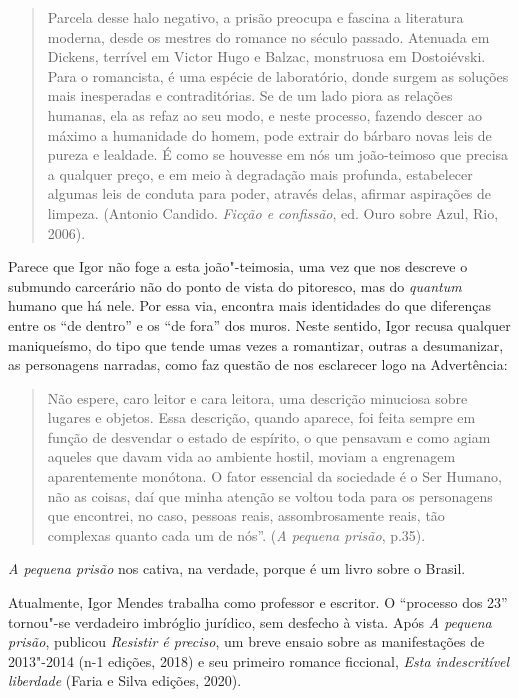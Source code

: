 \documentclass[11pt]{extarticle}
\begin{document}
\begin{quote}
Parcela desse halo negativo, a prisão preocupa e fascina a
literatura moderna, desde os mestres do romance no século passado.
Atenuada em Dickens, terrível em Victor Hugo e Balzac, monstruosa em
Dostoiévski. Para o romancista, é uma espécie de laboratório, donde
surgem as soluções mais inesperadas e contraditórias. Se de um lado
piora as relações humanas, ela as refaz ao seu modo, e neste processo,
fazendo descer ao máximo a humanidade do homem, pode extrair do bárbaro
novas leis de pureza e lealdade. É como se houvesse em nós um
joão-teimoso que precisa a qualquer preço, e em meio à degradação mais
profunda, estabelecer algumas leis de conduta para poder, através delas,
afirmar aspirações de limpeza. (Antonio Candido. \emph{Ficção e confissão},
ed. Ouro sobre Azul, Rio, 2006).
\end{quote}

Parece que Igor não foge a esta joão"-teimosia, uma vez que nos descreve
o submundo carcerário não do ponto de vista do pitoresco, mas do
\emph{quantum} humano que há nele. Por essa via, encontra mais
identidades do que diferenças entre os ``de dentro'' e os ``de fora''
dos muros. Neste sentido, Igor recusa qualquer maniqueísmo, do tipo que
tende umas vezes a romantizar, outras a desumanizar, as personagens
narradas, como faz questão de nos esclarecer logo na Advertência:

\begin{quote}
Não espere, caro leitor e cara leitora, uma descrição minuciosa
sobre lugares e objetos. Essa descrição, quando aparece, foi feita
sempre em função de desvendar o estado de espírito, o que pensavam e
como agiam aqueles que davam vida ao ambiente hostil, moviam a
engrenagem aparentemente monótona. O fator essencial da sociedade é o
Ser Humano, não as coisas, daí que minha atenção se voltou toda para os
personagens que encontrei, no caso, pessoas reais, assombrosamente
reais, tão complexas quanto cada um de nós''. (\emph{A
pequena prisão}, p.35).
\end{quote}


\emph{A
pequena prisão} nos cativa, na verdade, porque é um livro sobre o
Brasil.

Atualmente, Igor Mendes trabalha como professor e escritor. O ``processo
dos 23'' tornou"-se verdadeiro imbróglio jurídico, sem desfecho à vista.
Após \emph{A
pequena prisão}, publicou \emph{Resistir é preciso}, um breve
ensaio sobre as manifestações de 2013"-2014 (n-1 edições, 2018) e seu
primeiro romance ficcional, \emph{Esta indescritível liberdade} (Faria e
Silva edições, 2020).
\end{document}
